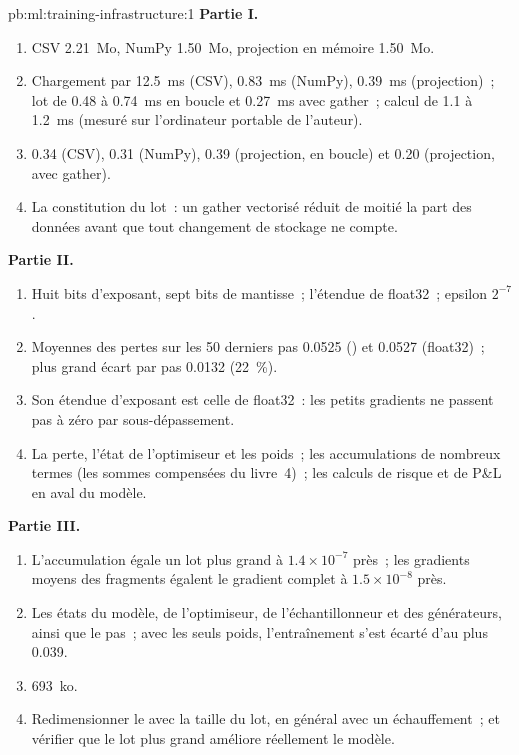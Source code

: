 \begin{solution}{pb:ml:training-infrastructure:1}
\textbf{Partie I.}
\begin{enumerate}
\item CSV 2.21~Mo, NumPy 1.50~Mo, projection en mémoire 1.50~Mo.
\item Chargement par  12.5~ms (CSV), 0.83~ms (NumPy), 0.39~ms (projection)~; lot de 0.48 à 0.74~ms en boucle et 0.27~ms avec gather~; calcul de
1.1 à 1.2~ms (mesuré sur l'ordinateur portable de l'auteur).
\item 0.34 (CSV), 0.31 (NumPy), 0.39 (projection, en boucle) et 0.20 (projection, avec gather).
\item La constitution du lot~: un gather vectorisé réduit de moitié la part des données avant que tout changement de stockage ne compte.
\end{enumerate}
\textbf{Partie II.}
\begin{enumerate}[resume]
\item Huit bits d'exposant, sept bits de mantisse~; l'étendue de float32~; epsilon $2^{-7}$.
\item Moyennes des pertes sur les 50 derniers pas 0.0525 () et 0.0527 (float32)~; plus grand écart par pas 0.0132 (22~\%).
\item Son étendue d'exposant est celle de float32~: les petits gradients ne passent pas à zéro par sous-dépassement.
\item La perte, l'état de l'optimiseur et les poids~; les accumulations de nombreux termes (les sommes compensées du livre~4)~; les calculs de risque et de P\&L
en aval du modèle.
\end{enumerate}
\textbf{Partie III.}
\begin{enumerate}[resume]
\item L'accumulation égale un lot plus grand à $1.4\times10^{-7}$ près~; les gradients moyens des fragments égalent le gradient complet à
$1.5\times10^{-8}$ près.
\item Les états du modèle, de l'optimiseur, de l'échantillonneur et des générateurs, ainsi que le pas~; avec les seuls poids, l'entraînement s'est écarté d'au plus 0.039.
\item 693~ko.
\item Redimensionner le  avec la taille du lot, en général avec un échauffement~; et vérifier que le lot plus grand améliore réellement le modèle.

\end{enumerate}
\end{solution}
